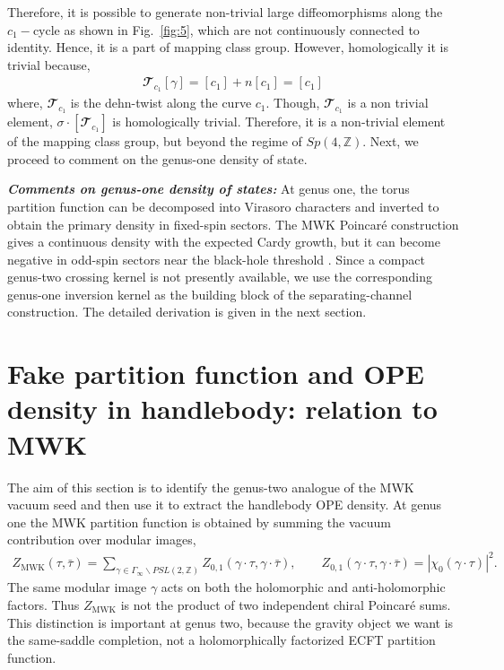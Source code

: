 \documentclass[12 pt]{article}
\begin{document}
Therefore, it is possible to generate non-trivial large diffeomorphisms along the $c_1-$cycle as shown in Fig.~\eqref{fig:5}, which are not continuously connected to identity. Hence, it is a part of mapping class group. However, homologically it is trivial because,
\begin{align}
    \mathbfcal{T}_{c_{1}}[\gamma]=[c_1]+n[c_1]=[c_1]
\end{align}
where, $\mathbfcal{T}_{c_{1}}$ is the dehn-twist along the curve $c_1$. Though, $\mathbfcal{T}_{c_{1}}$ is a non trivial element, $\sigma\cdot[\mathbfcal{T}_{c_{1}}]$ is homologically trivial. Therefore, it is a non-trivial element of the mapping class group, but beyond the regime of $Sp(4,\mathbb{Z})$. Next, we proceed to comment on the genus-one density of state.

\vspace{0.2 cm}
\noindent
\textit{\textbf{Comments on genus-one density of states:}}
At genus one, the torus partition function can be decomposed into Virasoro characters and inverted to obtain the primary density in fixed-spin sectors. The MWK Poincar\'e construction gives a continuous density with the expected Cardy growth, but it can become negative in odd-spin sectors near the black-hole threshold \cite{Maloney:2007ud,Alday:2019vdr,Alday:2020qkm}. Since a compact genus-two crossing kernel is not presently available, we use the corresponding genus-one inversion kernel as the building block of the separating-channel construction. The detailed derivation is given in the next section.
\section{Fake partition function and OPE density in handlebody: relation to MWK}
\label{sec4}
The aim of this section is to identify the genus-two analogue of the MWK vacuum seed and then use it to extract the handlebody OPE density.  At genus one the MWK partition function is obtained by summing the vacuum contribution over modular images,
\begin{align}
    Z_{\textrm{MWK}}(\tau,\bar \tau)
=\sum_{\gamma\in\Gamma_\infty\backslash PSL(2,\mathbb Z)}
    Z_{0,1}(\gamma\cdot\tau,\gamma\cdot\bar\tau),
    \qquad
    Z_{0,1}(\gamma\cdot\tau,\gamma\cdot\bar\tau)
    =|\chi_0(\gamma\cdot\tau)|^2 .
\end{align}
The same modular image \(\gamma\) acts on both the holomorphic and anti-holomorphic factors.  Thus \(Z_{\textrm{MWK}}\) is not the product of two independent chiral Poincar\'e sums.  This distinction is important at genus two, because the gravity object we want is the same-saddle completion, not a holomorphically factorized ECFT partition function.
\end{document}
